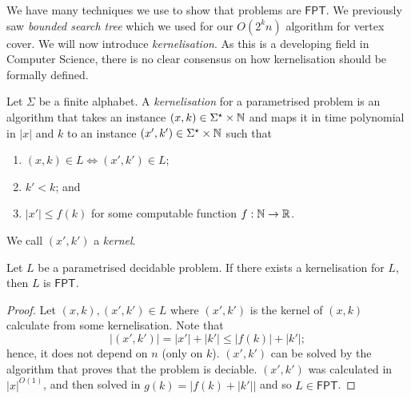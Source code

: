 We have many techniques we use to show that problems are $\mathsf{FPT}$.
We previously saw \emph{bounded search tree} which we used for our
$O(2^kn)$ algorithm for vertex cover.
We will now introduce \emph{kernelisation}.
As this is a developing field in Computer Science, there is no
clear consensus on how kernelisation should be formally defined.

\begin{definition}[Kernelisation]
	Let $\Sigma$ be a finite alphabet.
	A \emph{kernelisation} for a parametrised problem
	is an algorithm that takes an instance $(x,k) \in \Sigma^\star \times \mathbb{N}$
	and maps it in time polynomial in $\left\lvert x \right\rvert$ and $k$
	to an instance $(x', k') \in \Sigma^\star \times \mathbb{N}$
	such that
	\begin{enumerate}
		\item $(x, k) \in L \iff (x', k') \in L$;
		\item $k' < k$; and
		\item $\left\lvert x' \right\rvert \leq f(k)$ for some
			computable function $f: \mathbb{N} \to \mathbb{R}$.
	\end{enumerate}
	We call $(x', k')$ a \emph{kernel}.
\end{definition}

\begin{proposition}[]
	\label{prop:kernel-implies-fpt}
	Let $L$ be a parametrised decidable problem.
	If there exists a kernelisation for $L$, then $L$ is $\mathsf{FPT}$.
\end{proposition}

\begin{proof}
	Let $(x, k), (x', k') \in L$ where
	$(x', k')$ is the kernel of $(x,k)$
	calculate from some kernelisation.
	Note that
	\[
		\left\lvert (x', k') \right\rvert
		= \left\lvert x' \right\rvert + \left\lvert k' \right\rvert
		\leq \left\lvert f(k) \right\rvert + \left\lvert k' \right\rvert;
	\]
	hence, it does not depend on $n$ (only on $k$).
	$(x', k')$ can be solved by the algorithm that proves
	that the problem is deciable.
	$(x', k')$ was calculated in $\left\lvert x \right\rvert^{O(1)}$,
	and then solved in 
	$g(k) = \left\lvert f(k) + \left\lvert k' \right\rvert \right\rvert$
	and so $L \in \mathsf{FPT}$.
\end{proof}


